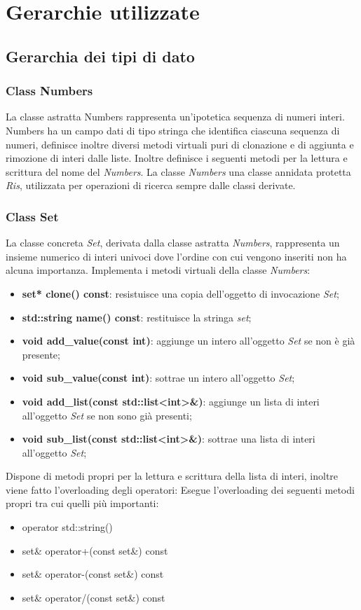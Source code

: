 \documentclass[a4paper,10pt]{article}
\begin{document}
	\section{Gerarchie utilizzate}
	\subsection{Gerarchia dei tipi di dato}
	\subsubsection{Class Numbers}
	La classe astratta Numbers rappresenta un’ipotetica sequenza di numeri interi. Numbers ha un campo dati di tipo stringa che identifica ciascuna sequenza di numeri, definisce inoltre diversi metodi virtuali puri di clonazione e di aggiunta e rimozione di interi dalle liste.
    Inoltre definisce i seguenti metodi per la lettura e scrittura del nome del \textit{Numbers}.
    La classe \textit{Numbers} una classe annidata protetta \textit{Ris}, utilizzata per operazioni di ricerca sempre dalle classi derivate.
    
    \subsubsection{Class Set}
    La classe concreta \textit{Set}, derivata dalla classe astratta \textit{Numbers}, rappresenta un insieme numerico di interi univoci dove l’ordine con cui vengono inseriti non ha alcuna importanza. 
    Implementa i metodi virtuali della classe \textit{Numbers}:
	\begin{itemize}
        \item \textbf{set* clone() const}: resistuisce una copia dell'oggetto di invocazione \textit{Set};
		\item \textbf{std::string name() const}: restituisce la stringa \textit{set};
        \item \textbf{void add\_value(const int)}: aggiunge un intero all'oggetto \textit{Set} se non è già presente;
		\item \textbf{void sub\_value(const int)}: sottrae un intero all'oggetto \textit{Set};
		\item \textbf{void add\_list(const std::list<int>\&)}: aggiunge un lista di interi all'oggetto \textit{Set} se non sono già presenti;
        \item \textbf{void sub\_list(const std::list<int>\&)}: sottrae una lista di interi all'oggetto \textit{Set};
    \end{itemize}
    Dispone di metodi propri per la lettura e scrittura della lista di interi, inoltre viene fatto l'overloading  degli operatori:
    Esegue l'overloading dei seguenti metodi propri tra cui  quelli più importanti:
    \begin{itemize}
        \item operator std::string()
        \item set\& operator+(const set\&) const
        \item set\& operator-(const set\&) const
        \item set\& operator/(const set\&) const
    \end{itemize}
\end{document}
